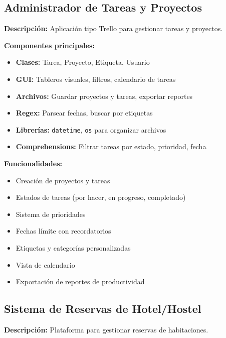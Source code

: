 \documentclass[12pt,a4paper]{article}
\begin{document}
\subsection{Administrador de Tareas y Proyectos}

\textbf{Descripción:} Aplicación tipo Trello para gestionar tareas y proyectos.

\vspace{0.5em}
\textbf{Componentes principales:}
\begin{itemize}
    \item \textbf{Clases:} Tarea, Proyecto, Etiqueta, Usuario
    \item \textbf{GUI:} Tableros visuales, filtros, calendario de tareas
    \item \textbf{Archivos:} Guardar proyectos y tareas, exportar reportes
    \item \textbf{Regex:} Parsear fechas, buscar por etiquetas
    \item \textbf{Librerías:} \texttt{datetime}, \texttt{os} para organizar archivos
    \item \textbf{Comprehensions:} Filtrar tareas por estado, prioridad, fecha
\end{itemize}

\vspace{0.5em}
\textbf{Funcionalidades:}
\begin{itemize}
    \item Creación de proyectos y tareas
    \item Estados de tareas (por hacer, en progreso, completado)
    \item Sistema de prioridades
    \item Fechas límite con recordatorios
    \item Etiquetas y categorías personalizadas
    \item Vista de calendario
    \item Exportación de reportes de productividad
\end{itemize}

\subsection{Sistema de Reservas de Hotel/Hostel}

\textbf{Descripción:} Plataforma para gestionar reservas de habitaciones.
\end{document}
